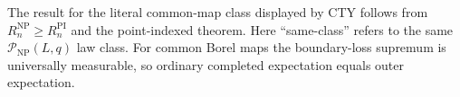 The result for the literal common-map class displayed by CTY follows from \(R_n^{\mathrm{NP}}\geq R_n^{\mathrm{PI}}\) and the point-indexed theorem.  Here ``same-class'' refers to the same \(\mathcal P_{\mathrm{NP}}(L,q)\) law class.  For common Borel maps the boundary-loss supremum is universally measurable, so ordinary completed expectation equals outer expectation.